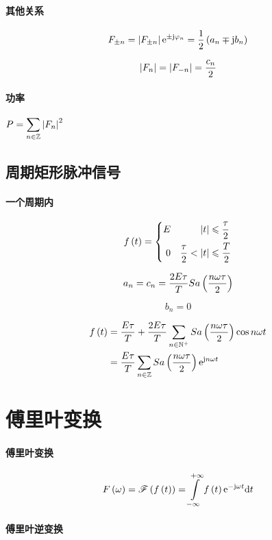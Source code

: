 \documentclass{article}
\begin{document}
\paragraph{其他关系}

\[F_{\pm n}=\left|F_{\pm n}\right|\mathrm e^{\pm\mathrm j\varphi_n}=\frac12\left(a_n\mp\mathrm j b_n\right)\]

\[\left|F_n\right|=\left|F_{-n}\right|=\frac{c_n}2\]

\paragraph{功率}$\displaystyle P=\sum_{n\in\mathbb Z}\left|F_n\right|^2$

\subsection{周期矩形脉冲信号}

\paragraph{一个周期内}

\[f\left(t\right)=
    \left\{\begin{aligned}
        E &  & \left|t\right|            & \leqslant\frac\tau2 \\
        0 &  & \frac\tau2<\left|t\right| & \leqslant\frac T2
    \end{aligned}\right.\]

\[a_n=c_n=\frac{2E\tau}TSa\left(\frac{n\omega\tau}2\right)\]

\[b_n=0\]

\[\begin{aligned}
        f\left(t\right) & =\frac{E\tau}T+\frac{2E\tau}T\sum_{n\in\mathbb N^+}Sa\left(\frac{n\omega\tau}2\right)\cos n\omega t \\
            & =\frac{E\tau}T\sum_{n\in\mathbb Z} Sa\left(\frac{n\omega\tau}2\right)\mathrm e^{\mathrm j n\omega t}
    \end{aligned}\]

\section{傅里叶变换}

\paragraph{傅里叶变换}

\[\fw=\fourier\ft=\impint\ft\e^{-\j\omega t}\d t\]

\paragraph{傅里叶逆变换}
\end{document}

